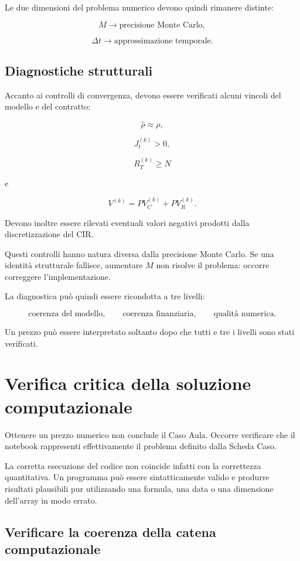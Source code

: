 Le due dimensioni del problema numerico devono quindi rimanere distinte:

\[
M
\longrightarrow
\text{precisione Monte Carlo},
\]

\[
\Delta t
\longrightarrow
\text{approssimazione temporale}.
\]

\subsection{Diagnostiche strutturali}

Accanto ai controlli di convergenza, devono essere verificati alcuni vincoli
del modello e del contratto:

\[
\widehat\rho\approx\rho,
\]

\[
J_t^{(k)}>0,
\]

\[
R_T^{(k)}\geq N
\]

\noindent e

\[
V^{(k)}
=
PV_C^{(k)}
+
PV_R^{(k)}.
\]

Devono inoltre essere rilevati eventuali valori negativi prodotti dalla
discretizzazione del CIR.

Questi controlli hanno natura diversa dalla precisione Monte Carlo. Se una
identit\`a strutturale fallisce, aumentare \(M\) non risolve il problema:
occorre correggere l'implementazione.

La diagnostica pu\`o quindi essere ricondotta a tre livelli:

\[
\text{coerenza del modello},
\qquad
\text{coerenza finanziaria},
\qquad
\text{qualit\`a numerica}.
\]

Un prezzo pu\`o essere interpretato soltanto dopo che tutti e tre i livelli
sono stati verificati.


\section{Verifica critica della soluzione computazionale}

Ottenere un prezzo numerico non conclude il Caso Aula. Occorre verificare che
il notebook rappresenti effettivamente il problema definito dalla Scheda Caso.

La corretta esecuzione del codice non coincide infatti con la correttezza
quantitativa. Un programma pu\`o essere sintatticamente valido e produrre
risultati plausibili pur utilizzando una formula, una data o una dimensione
dell'array in modo errato.

\subsection{Verificare la coerenza della catena computazionale}

